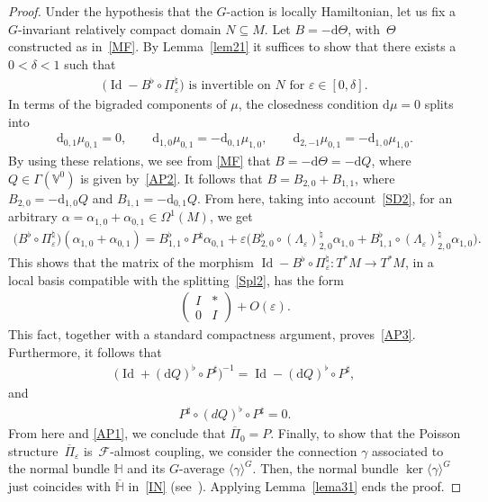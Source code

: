 \documentclass[pdftex]{sigma}
\numberwithin{equation}{section}
\begin{document}
\begin{proof}
Under the hypothesis that the $G$-action is locally Hamiltonian, let us f\/ix a $G$-invariant relatively compact domain $N\subseteq M$. Let $B=-\mathrm{d}\Theta$, with~$\Theta$ constructed as in~\eqref{MF}. By Lemma~\ref{lem21} it suf\/f\/ices to show that there exists a $0<\delta <1$ such that
\begin{gather}
\big( \operatorname{Id}-B^{\flat}\circ\Pi_{\varepsilon}^{\natural}\big) \mbox{ is invertible on }N\mbox{ for }\varepsilon\in
[0,\delta].\label{AP3}
\end{gather}
In terms of the bigraded components of $\mu$, the closedness condition $\mathrm{d}\mu=0$ splits into
\begin{gather*}
\mathrm{d}_{0,1}\mu_{0,1}=0,\qquad \mathrm{d}_{1,0}\mu_{0,1}=-\mathrm{d}_{0,1}\mu_{1,0},
\qquad \mathrm{d}_{2,-1}\mu_{0,1}=-\mathrm{d}_{1,0}\mu_{1,0}.
\end{gather*}
By using these relations, we see from \eqref{MF} that $B=-\mathrm{d}\Theta=-\mathrm{d}Q$, where $Q\in\Gamma(\mathbb{V}^{0})$ is given by~\eqref{AP2}. It follows that $B=B_{2,0}+B_{1,1}$, where $B_{2,0}=-\mathrm{d}_{1,0}Q$ and $B_{1,1}=-\mathrm{d}_{0,1}Q$. From here, taking into account~\eqref{SD2}, for an arbitrary $\alpha=\alpha_{1,0}+\alpha_{0,1}\in\Omega^{1}(M)$, we get
\begin{gather*}
\big(B^{\flat}\circ\Pi_{\varepsilon}^{\natural}\big)(\alpha_{1,0}+\alpha _{0,1})=B_{1,1}^{\flat}\circ P^{\natural}\alpha_{0,1}+\varepsilon\big(
B_{2,0}^{\flat}\circ(\Lambda_{\varepsilon})_{2,0}^{\natural}\alpha _{1,0}+B_{1,1}^{\flat}\circ(\Lambda_{\varepsilon})_{2,0}^{\natural}\alpha_{1,0}\big) .
\end{gather*}
This shows that the matrix of the morphism $\operatorname{Id}-B^{\flat}\circ\Pi_{\varepsilon}^{\natural}\colon T^{\ast}M\rightarrow T^{\ast}M$, in a local
basis compatible with the splitting~\eqref{Spl2}, has the form
\begin{gather*}
\begin{pmatrix}
I & \ast\\
0 & I
\end{pmatrix}
 +O(\varepsilon).
\end{gather*}
This fact, together with a standard compactness argument, proves~\eqref{AP3}. Furthermore, it follows that
\begin{gather}\label{R1}%
\big(\operatorname{Id}+(\mathrm{d}Q)^{\flat}\circ P^{\sharp}\big)^{-1}=\operatorname{Id}-(\mathrm{d}Q)^{\flat}\circ P^{\sharp},
\end{gather}
and
\begin{gather}\label{R2}
P^{\sharp}\circ(dQ)^{\flat}\circ P^{\sharp}=0.
\end{gather}
From here and \eqref{AP1}, we conclude that $\overline{\Pi}_{0}=P$. Finally, to show that the Poisson structure~$\overline{\Pi}_{\varepsilon}$ is~$\mathcal{F}$-almost coupling, we consider the connection $\gamma$ associated to the normal bundle $\mathbb{H}$ and its $G$-average $ \langle\gamma \rangle^{G}$. Then, the normal bundle $\ker \langle\gamma \rangle^{G}$ just coincides with $\overline{\mathbb{H}}$ in~\eqref{IN} (see~\cite{JVYV-14}). Applying Lemma~\ref{lema31} ends the proof.
\end{proof}
\end{document}
